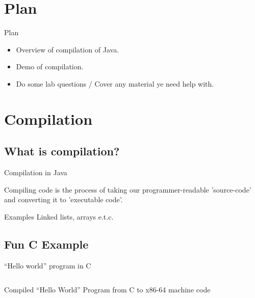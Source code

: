 \documentclass[table,xcolor=table]{IFMG-beamer}
\begin{document}

\setcounter{framenumber}{0}



\section{Plan}

\begin{frame}{Plan}

  \begin{itemize}[<+->]
    \item Overview of compilation of Java.
    \item Demo of compilation.
    \item Do some lab questions / Cover any material ye need help with.
  \end{itemize}

\end{frame}

\section{Compilation}
\subsection{What is compilation?}
\begin{frame}{Compilation in Java}

  Compiling code is the process of taking our programmer-readable 'source-code' and converting it to 'executable code'.

  \begin{exampleblock}{Examples}
    Linked lists, arrays e.t.c.
  \end{exampleblock}
\end{frame}

\subsection{Fun C Example}
\begin{frame}{``Hello world'' program in C}
  \inputminted{C}{code/main.c}
\end{frame}

\begin{frame}{Compiled ``Hello World'' Program from C to x86-64 machine code}
  \inputminted{objdump}{code/hello_world_hex}
\end{frame}
\end{document}
